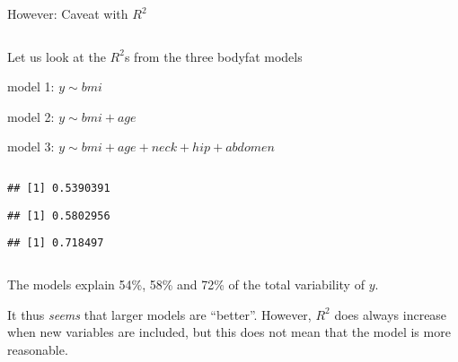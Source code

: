 \documentclass[10pt,ignorenonframetext,]{beamer}
\newenvironment{Shaded}{\begin{snugshade}}{\end{snugshade}}
\newcommand{\KeywordTok}[1]{\textcolor[rgb]{0.13,0.29,0.53}{\textbf{#1}}}
\newcommand{\NormalTok}[1]{#1}
\newcommand{\OperatorTok}[1]{\textcolor[rgb]{0.81,0.36,0.00}{\textbf{#1}}}
\begin{document}
\begin{frame}[fragile]

\begin{block}{However: Caveat with \(R^2\)}

\(~\)

Let us look at the \(R^2\)s from the three bodyfat models

\vspace{2mm}

model 1: \(y\sim bmi\)

model 2: \(y\sim bmi + age\)

model 3: \(y\sim bmi + age + neck + hip + abdomen\)

\(~\)

\tiny

\begin{Shaded}
\end{Shaded}

\begin{verbatim}
## [1] 0.5390391
\end{verbatim}

\begin{Shaded}
\end{Shaded}

\begin{verbatim}
## [1] 0.5802956
\end{verbatim}

\begin{Shaded}
\end{Shaded}

\begin{verbatim}
## [1] 0.718497
\end{verbatim}

\(~\)

\normalsize

The models explain 54\%, 58\% and 72\% of the total variability of
\(y\).

It thus \emph{seems} that larger models are ``better''. However, \(R^2\)
does always increase when new variables are included, but this does not
mean that the model is more reasonable.

\end{block}

\end{frame}
\end{document}
